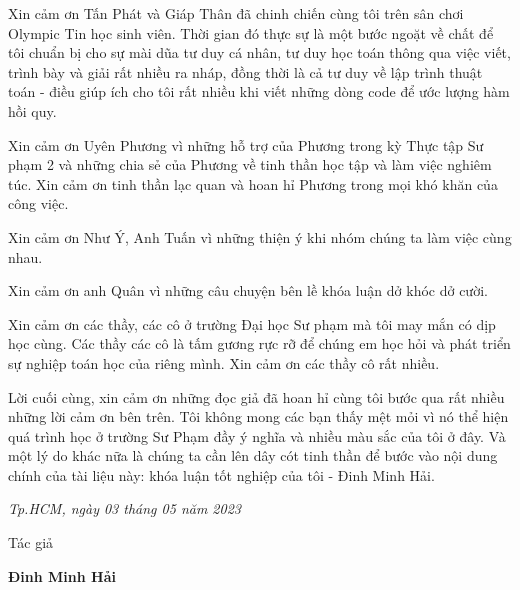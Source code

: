 Xin cảm ơn Tấn Phát và Giáp Thân đã chinh chiến cùng tôi trên sân chơi Olympic Tin học sinh viên. Thời gian đó thực sự là một bước ngoặt về chất để tôi chuẩn bị cho sự mài dũa tư duy cá nhân, tư duy học toán thông qua việc viết, trình bày và giải rất nhiều ra nháp, đồng thời là cả tư duy về lập trình thuật toán - điều giúp ích cho tôi rất nhiều khi viết những dòng code để ước lượng hàm hồi quy.

Xin cảm ơn Uyên Phương vì những hỗ trợ của Phương trong kỳ Thực tập Sư phạm 2 và những chia sẻ của Phương về tinh thần học tập và làm việc nghiêm túc. Xin cảm ơn tinh thần lạc quan và hoan hỉ Phương trong mọi khó khăn của công việc.

Xin cảm ơn Như Ý, Anh Tuấn vì những thiện ý khi nhóm chúng ta làm việc cùng nhau.

Xin cảm ơn anh Quân vì những câu chuyện bên lề khóa luận dở khóc dở cười.

Xin cảm ơn các thầy, các cô ở trường Đại học Sư phạm mà tôi may mắn có dịp học cùng. Các thầy các cô là tấm gương rực rỡ để chúng em học hỏi và phát triển sự nghiệp toán học của riêng mình. Xin cảm ơn các thầy cô rất nhiều.

Lời cuối cùng, xin cảm ơn những đọc giả đã hoan hỉ cùng tôi bước qua rất nhiều những lời cảm ơn bên trên. Tôi không mong các bạn thấy mệt mỏi vì nó thể hiện quá trình học ở trường Sư Phạm đầy ý nghĩa và nhiều màu sắc của tôi ở đây. Và một lý do khác nữa là chúng ta cần lên dây cót tinh thần để bước vào nội dung chính của tài liệu này: khóa luận tốt nghiệp của tôi - Đinh Minh Hải.

\begin{flushright}
{\it Tp.HCM, ngày 03 tháng 05 năm 2023}

Tác giả\hskip 2cm\quad

\vskip 2cm

{\bf Đinh Minh Hải} $\;\;\;\;\;\;\;$ \hskip 1cm 
 \end{flushright}
\thispagestyle{empty}

